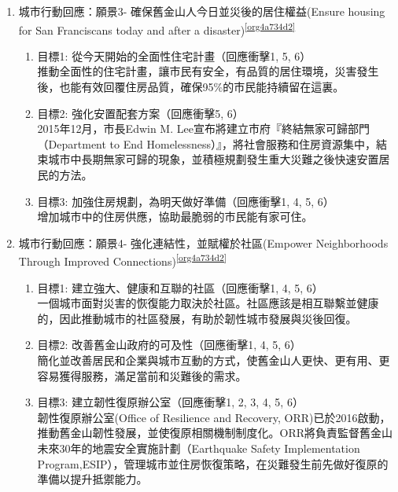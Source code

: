 \documentclass[a4paper,12pt]{article}
\begin{document}
\begin{enumerate}
\begin{enumerate}
\item 城市行動回應：願景3- 確保舊金山人今日並災後的居住權益(Ensure housing for San Franciscans today and after a disaster)\textsuperscript{\ref{org4a734d2}}
\label{sec:org54c5318}
\begin{enumerate}
\item 目標1: 從今天開始的全面性住宅計畫（回應衝擊1, 5, 6）\\
推動全面性的住宅計畫，讓市民有安全，有品質的居住環境，災害發生後，也能有效回覆住房品質，確保95\%的市民能持續留在這裏。\\
\item 目標2: 強化安置配套方案（回應衝擊5, 6）\\
2015年12月，市長Edwin M. Lee宣布將建立市府『終結無家可歸部門（Department to End Homelessness）』，將社會服務和住房資源集中，結束城市中長期無家可歸的現象，並積極規劃發生重大災難之後快速安置居民的方法。\\
\item 目標3: 加強住房規劃，為明天做好準備（回應衝擊1, 4, 5, 6）\\
增加城市中的住房供應，協助最脆弱的市民能有家可住。\\
\end{enumerate}

\item 城市行動回應：願景4- 強化連結性，並賦權於社區(Empower Neighborhoods Through Improved Connections)\textsuperscript{\ref{org4a734d2}}
\label{sec:orgac39795}
\begin{enumerate}
\item 目標1: 建立強大、健康和互聯的社區（回應衝擊1, 4, 5, 6）\\
一個城市面對災害的恢復能力取決於社區。社區應該是相互聯繫並健康的，因此推動城市的社區發展，有助於韌性城市發展與災後回復。\\
\item 目標2: 改善舊金山政府的可及性（回應衝擊1, 4, 5, 6）\\
簡化並改善居民和企業與城市互動的方式，使舊金山人更快、更有用、更容易獲得服務，滿足當前和災難後的需求。\\
\item 目標3: 建立韌性復原辦公室（回應衝擊1, 2, 3, 4, 5, 6）\\
韌性復原辦公室(Office of Resilience and Recovery, ORR)已於2016啟動，推動舊金山韌性發展，並使復原相關機制制度化。ORR將負責監督舊金山未來30年的地震安全實施計劃（Earthquake Safety Implementation Program,ESIP），管理城市並住房恢復策略，在災難發生前先做好復原的準備以提升抵禦能力。\\
\end{enumerate}


\end{enumerate}
\end{enumerate}
\end{document}
